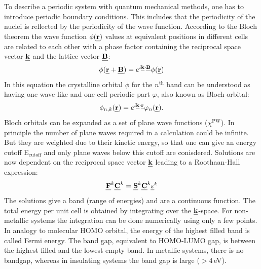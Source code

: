 \documentclass[11pt,DIV=13,BCOR=5mm,a4paper,headinclude]{scrbook}
\def\mathbi#1{\textbf{\em #1}}
\renewcommand{\vec}[1]{\mathbi{#1}}
\begin{document}
To describe a periodic system with quantum mechanical methods, one has to introduce periodic boundary conditions.
This includes that the periodicity of the nuclei is reflected by the periodicity of the wave function.
According to the Bloch theorem\cite{Bloch1928} the wave function $\phi(\vec{r})$ values at equivalent positions in different cells are related to each other with a phase factor containing the reciprocal space vector $\vec{k}$ and the lattice vector $\vec{B}$:
\begin{equation}
 \phi(\vec{r} + \vec{B})=e^{i\vec{k}\cdot\vec{B}}\phi(\vec{r})
\end{equation}
In this equation the crystalline orbital $\phi$ for the $n^\textrm{th}$ band can be understood as having one wave-like and one cell periodic part $\varphi$, also known as Bloch orbital:
\begin{equation}
 \phi_{n,k}(\vec{r})=e^{i\vec{k}\cdot\vec{r}}\varphi_n(\vec{r}).
\end{equation}
Bloch orbitals can be expanded as a set of plane wave functions ($\chi^\textrm{PW}$).
In principle the number of plane waves required in a calculation could be infinite.
But they are weighted due to their kinetic energy, so that one can give an energy cutoff E$_\textrm{cutoff}$ and only plane waves below this cutoff are conisdered.
Solutions are now dependent on the reciprocal space vector $\vec{k}$ leading to a Roothaan-Hall expression:
\begin{equation}
 \vec{F}^k\vec{C}^k=\vec{S}^k\vec{C}^k\vec{$\varepsilon$}^k
\end{equation}
The solutions give a band (range of energies) and are a continuous function.
The total energy per unit cell is obtained by integrating over the $\vec{k}$-space.
For non-metallic systems the integration can be done numerically using only a few points\cite{monkhorst}.
In analogy to molecular HOMO orbital, the energy of the highest filled band is called Fermi energy.
The band gap, equivalent to HOMO-LUMO gap, is between the highest filled and the lowest empty band.
In metallic systems, there is no bandgap, whereas in insulating systems the band gap is large ($>4\,$eV\cite{holleman2007lehrbuch}).
\\
\end{document}
